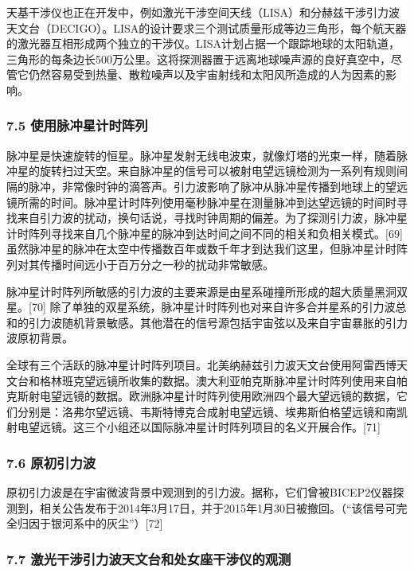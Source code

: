 天基干涉仪也正在开发中，例如激光干涉空间天线（LISA）和分赫兹干涉引力波天文台（DECIGO）。LISA的设计要求三个测试质量形成等边三角形，每个航天器的激光器互相形成两个独立的干涉仪。LISA计划占据一个跟踪地球的太阳轨道，三角形的每条边长500万公里。这将探测器置于远离地球噪声源的良好真空中，尽管它仍然容易受到热量、散粒噪声以及宇宙射线和太阳风所造成的人为因素的影响。

\subsubsection{7.5 使用脉冲星计时阵列}

脉冲星是快速旋转的恒星。脉冲星发射无线电波束，就像灯塔的光束一样，随着脉冲星的旋转扫过天空。来自脉冲星的信号可以被射电望远镜检测为一系列有规则间隔的脉冲，非常像时钟的滴答声。引力波影响了脉冲从脉冲星传播到地球上的望远镜所需的时间。脉冲星计时阵列使用毫秒脉冲星在测量脉冲到达望远镜的时间时寻找来自引力波的扰动，换句话说，寻找时钟周期的偏差。为了探测引力波，脉冲星计时阵列寻找来自几个脉冲星的脉冲到达时间之间不同的相关和负相关模式。[69] 虽然脉冲星的脉冲在太空中传播数百年或数千年才到达我们这里，但脉冲星计时阵列对其传播时间远小于百万分之一秒的扰动非常敏感。

脉冲星计时阵列所敏感的引力波的主要来源是由星系碰撞所形成的超大质量黑洞双星。[70] 除了单独的双星系统，脉冲星计时阵列也对来自许多合并星系的引力波总和的引力波随机背景敏感。其他潜在的信号源包括宇宙弦以及来自宇宙暴胀的引力波原初背景。

全球有三个活跃的脉冲星计时阵列项目。北美纳赫兹引力波天文台使用阿雷西博天文台和格林班克望远镜所收集的数据。澳大利亚帕克斯脉冲星计时阵列使用来自帕克斯射电望远镜的数据。欧洲脉冲星计时阵列使用欧洲四个最大望远镜的数据，它们分别是：洛弗尔望远镜、韦斯特博克合成射电望远镜、埃弗斯伯格望远镜和南凯射电望远镜。这三个小组还以国际脉冲星计时阵列项目的名义开展合作。[71]

\subsubsection{7.6 原初引力波}

原初引力波是在宇宙微波背景中观测到的引力波。据称，它们曾被BICEP2仪器探测到，相关公告发布于2014年3月17日，并于2015年1月30日被撤回。（“该信号可完全归因于银河系中的灰尘”）[72]

\subsubsection{7.7 激光干涉引力波天文台和处女座干涉仪的观测}

